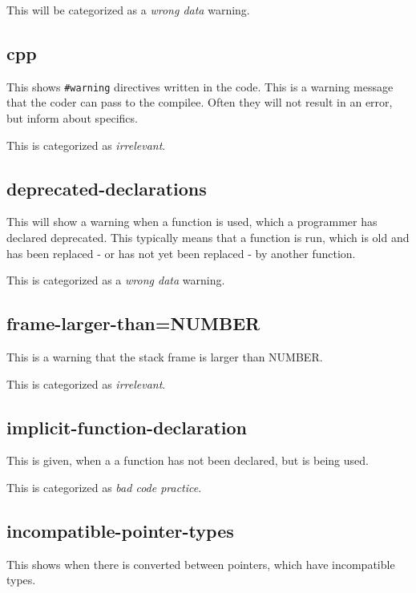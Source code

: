 \documentclass[a4paper,11pt]{report}
\newcommand{\textcode}[1]{\fboxsep=1pt\texttt{\colorbox{gray!20}{#1}}}
\newcommand{\figa}{
    \begin{figure}[!htpb]
    \centering
}
\newcommand{\figb}[2]{
    \caption{#1}
    \label{#2}
    \end{figure}
}
\begin{document}
This will be categorized as a \emph{wrong data} warning.




            \subsection*{cpp}
This shows \textcode{\#warning} directives written in the code. This is a warning
message that the coder can pass to the compilee. Often they will not result in 
an error, but inform about specifics.

This is categorized as \emph{irrelevant}.


            \subsection*{deprecated-declarations}
This will show a warning when a function is used, which a programmer has 
declared deprecated. This typically means that a function is run, which is old
and has been replaced - or has not yet been replaced - by another function.

This is categorized as a \emph{wrong data} warning.


            \subsection*{frame-larger-than=NUMBER}
This is a warning that the stack frame is larger than NUMBER.

This is categorized as \emph{irrelevant}.


            \subsection*{implicit-function-declaration}
This is given, when a a function has not been declared, but is being used.

This is categorized as \emph{bad code practice}.


            \iffalse %

            \subsection*{incompatible-pointer-types}
This shows when there is converted between pointers, which have incompatible 
types.
\end{document}
